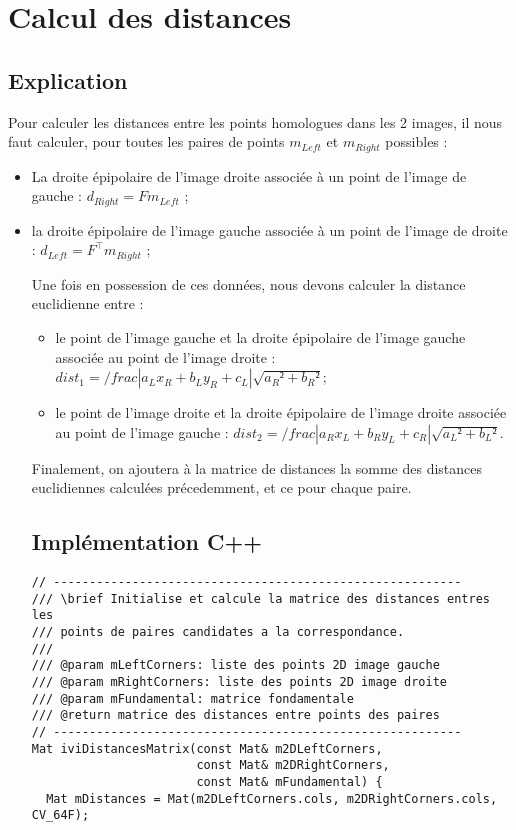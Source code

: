 \documentclass[a4paper]{article}
\begin{document}
\section{Calcul des distances}

\subsection{Explication}

Pour calculer les distances entre les points homologues dans les 2 images, il nous faut calculer, pour toutes les paires de points $m_{Left}$ et $m_{Right}$ possibles :
\begin{itemize}
  \item La droite épipolaire de l'image droite associée à un point de l'image de gauche : $d_{Right} = Fm_{Left}$ ;
  \item la droite épipolaire de l'image gauche associée à un point de l'image de droite : $d_{Left} = F^\top m_{Right}$ ;

Une fois en possession de ces données, nous devons calculer la distance euclidienne entre :
\begin{itemize}
  \item le point de l'image gauche et la droite épipolaire de l'image gauche associée au point de l'image droite : $dist_1 = /frac{|a_Lx_R + b_Ly_R + c_L|}{\sqrt{a_R² + b_R²}}$;
  \item le point de l'image droite et la droite épipolaire de l'image droite associée au point de l'image gauche : $dist_2 = /frac{|a_Rx_L + b_Ry_L + c_R|}{\sqrt{a_L² + b_L²}}$.
\end{itemize}

Finalement, on ajoutera à la matrice de distances la somme des distances euclidiennes calculées précedemment, et ce pour chaque paire.

\subsection{Implémentation C++}

\begin{lstlisting}
// ---------------------------------------------------------
/// \brief Initialise et calcule la matrice des distances entres les
/// points de paires candidates a la correspondance.
///
/// @param mLeftCorners: liste des points 2D image gauche
/// @param mRightCorners: liste des points 2D image droite
/// @param mFundamental: matrice fondamentale
/// @return matrice des distances entre points des paires
// ---------------------------------------------------------
Mat iviDistancesMatrix(const Mat& m2DLeftCorners,
                       const Mat& m2DRightCorners,
                       const Mat& mFundamental) {
  Mat mDistances = Mat(m2DLeftCorners.cols, m2DRightCorners.cols, CV_64F);


\end{lstlisting}
\end{itemize}
\end{document}
